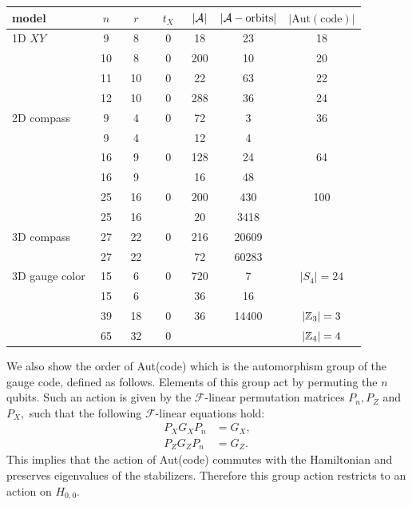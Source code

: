 \documentclass[12pt]{article}
\newcommand{\Field}{\mathcal{F}}
\begin{document}
\begin{center}
\begin{tabular}{ l|c|c|c|c|c|c } 
model &\ $n$\ &\ $r$\ &\ $t_X$\ & $|\mathcal{A}|$ & $|\mathcal{A}-\mathrm{orbits}|$ & 
$|\mathrm{Aut(code)}|$ \\
\hline
  1D $XY$ & 9 &  8& 0   & 18 & 23 & 18  \\
        & 10 & 8& 0   & 200 & 10 & 20  \\
        & 11 & 10 & 0 & 22 & 63 & 22  \\
        & 12 & 10 & 0 & 288 & 36 & 24  \\
\hline
    2D compass & 9 & 4 & 0 & 72 & 3 & 36 \\
            & 9 & 4 &    & 12 & 4 &  \\
            & 16 & 9  & 0 & 128 & 24 & 64 \\
            & 16 & 9  &    & 16 & 48 &  \\
            & 25 & 16 & 0 & 200 & 430 & 100 \\
            & 25 & 16 &    & 20  & 3418 &  \\
\hline
    3D compass & 27 & 22 & 0     & 216  & 20609  &     \\
               & 27 & 22 &    &  72 & 60283   &  \\
\hline
    3D gauge color & 15 & 6  & 0 & 720 & 7 & $|S_4|=24$ \\
                & 15 & 6  &  & 36 & 16 &  \\
                & 39 & 18 & 0 & 36 & 14400 & $|\mathbb{Z}_3|=3$  \\
                & 65 & 32 & 0 &    &       & $|\mathbb{Z}_4|=4$ \\
\end{tabular}
\end{center}

We also show the order of Aut(code) which is
the automorphism group of the gauge code, defined as follows.
Elements of this group act by permuting the $n$ qubits.
Such an action is given by the $\Field$-linear
permutation matrices
$P_n, P_Z$ and $P_X,$ such that the following $\Field$-linear equations hold:
\begin{align*}
    P_X G_X P_n &= G_X, \\
    P_Z G_Z P_n &= G_Z.
\end{align*}
This implies that the action of Aut(code)
commutes with the Hamiltonian and preserves eigenvalues of
the stabilizers. Therefore this group action restricts to an action
on $H_{0,0}.$
\end{document}
